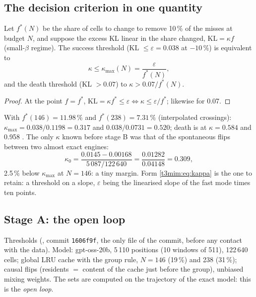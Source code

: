 \subsection{The decision criterion in one quantity}\label{t3mim:sec:p3-critere}

\begin{proposition}\label{t3mim:prop:kappa}
Let $f^\ast(N)$ be the share of cells to change to remove 10\,\% of the misses at budget $N$, and suppose the excess KL linear in the share changed, $\mathrm{KL} = \kappa f$ (small-$\beta$ regime). The success threshold (KL $\le \varepsilon = 0.038$ at $-10\,\%$) is equivalent to
\begin{equation}\label{t3mim:eq:kappa}
\kappa \le \kappa_{\max}(N) = \frac{\varepsilon}{f^\ast(N)},
\end{equation}
and the death threshold (KL $> 0.07$) to $\kappa > 0.07/f^\ast(N)$.
\end{proposition}
\begin{proof}
At the point $f = f^\ast$, $\mathrm{KL} = \kappa f^\ast \le \varepsilon \iff \kappa \le \varepsilon/f^\ast$; likewise for 0.07.
\end{proof}
With $f^\ast(146) = 11.98\,\%$ and $f^\ast(238) = 7.31\,\%$ (interpolated crossings): $\kappa_{\max} = 0.038/0.1198 = 0.317$ and $0.038/0.0731 = 0.520$; death is at $\kappa = 0.584$ and 0.958 \calc. The only $\kappa$ known before stage B was that of the spontaneous flips between two almost exact engines:
\begin{equation}\label{t3mim:eq:kappa0}
\kappa_0 = \frac{0.0145 - 0.00168}{5\,087/122\,640} = \frac{0.01282}{0.04148} = 0.309 ,
\end{equation}
2.5\,\% below $\kappa_{\max}$ at $N = 146$: a tiny margin. Form \eqref{t3mim:eq:kappa} is the one to retain: a threshold on a slope, $\varepsilon$ being the linearised slope of the fast mode times ten points.

\subsection{Stage A: the open loop}\label{t3mim:sec:p3-etageA}

Thresholds (, commit \texttt{1606f9f}, the only file of the commit, before any contact with the data). Model: gpt-oss-20b, 5\,110 positions (10 windows of 511), 122\,640 cells; global LRU cache with the group rule, $N = 146$ (19\,\%) and 238 (31\,\%); causal flips (residents $=$ content of the cache just before the group), unbiased mixing weights. The sets are computed on the trajectory of the exact model: this is the \emph{open loop}.


